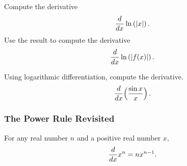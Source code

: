 \documentclass[10pt,t,presentation,ignorenonframetext,aspectratio=169]{beamer}
\begin{document}
\begin{frame}
  \vs
  \begin{question}
    Compute the derivative
    \[
      \frac{d}{\mathop{}\!d x}\ln{(|x|)} \,.
    \]
    Use the result to compute the derivative
    \[
      \frac{d}{\mathop{}\!d x}\ln{(|f(x)|)} \,.
    \]
  \end{question}
\end{frame}

\begin{frame}
  \vs
  \begin{question}
    Using logarithmic differentiation, compute the derivative.
    \[
      \frac{d}{\mathop{}\!d x}\Bigl(\dfrac{\sin{x}}{x}\Bigr) \,.
    \]
  \end{question}
\end{frame}

\begin{frame}
  \frametitle{The Power Rule Revisited}
  \begin{thm}
    For any real number $n$ and a positive real number $x$,
    \[
      \frac{d}{\mathop{}\!d x} x^n = n x^{n-1}.
    \]
  \end{thm}

\end{frame}
\end{document}
